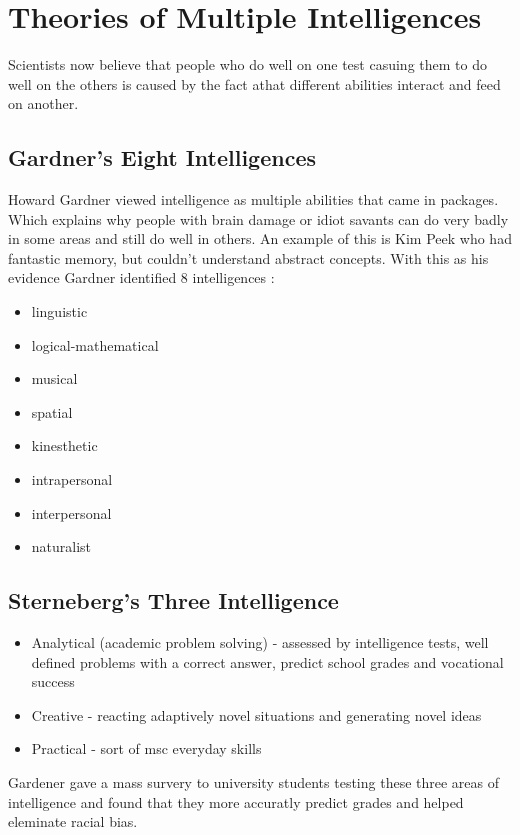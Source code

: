 \documentclass[12pt]{article}
\begin{document}
\section*{Theories of Multiple Intelligences}
Scientists now believe that people who do well on one test casuing them to do well on the others is caused by the fact athat different abilities interact and feed on another.
\subsection*{Gardner's Eight Intelligences}
Howard Gardner viewed intelligence as multiple abilities that came in packages. Which explains why people with brain damage or idiot savants can do very badly in some areas and still do well in others. An example of this is Kim Peek who had fantastic memory, but couldn't understand abstract concepts. With this as his evidence Gardner identified 8 intelligences : 
\begin{itemize}
\item linguistic
\item logical-mathematical
\item musical
\item spatial
\item kinesthetic
\item intrapersonal
\item interpersonal
\item naturalist
\end{itemize}
\subsection*{Sterneberg's Three Intelligence}
\begin{itemize}
\item  Analytical (academic problem solving) - assessed by intelligence tests, well defined problems with a correct answer, predict school grades and vocational success
\item Creative - reacting adaptively novel situations and generating novel ideas
\item Practical - sort of msc everyday skills
\end{itemize}
Gardener gave a mass survery to university students testing these three areas of intelligence and found that they more accuratly predict grades and helped eleminate racial bias. 
\end{document}
